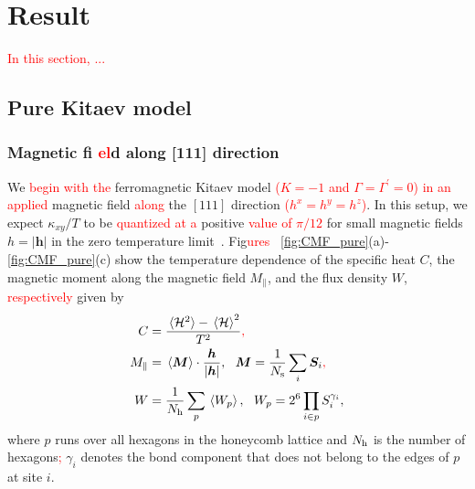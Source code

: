 \documentclass[twocolumn,superscriptaddress,showpacs, longbibliography, aps, prb]{revtex4-2}
\def\vec#1{\boldsymbol #1}
\newcommand{\red}[1]{\textcolor{red}{#1}}
\newcommand{\orange}[1]{\textcolor{orange}{#1}}
\begin{document}
\section{Result}\label{sec:Results}
\red{In this section, ...}

\subsection{Pure Kitaev model}
\label{sec:pureKitaev}
\subsubsection{Magnetic fi%
\red{el}d along [111] direction}
We %
\red{begin with the} ferromagnetic Kitaev model %
\red{($K=-1$ and $\Gamma = \Gamma^\prime = 0$)} 
\red{in an applied} magnetic field %
\red{along} the $[111]$ direction \red{($h^x=h^y=h^z$)}. 
In this setup, we expect %
$\kappa_{xy}/T$ to be \red{quantized at a} positive \red{value of $\pi/12$} 
for small magnetic fields $h = |\vec{h}|$ in 
the zero temperature limit~\cite{Kitaev2006}. 
%
Fig\red{ures}%
~\ref{fig:CMF_pure}(a)-\ref{fig:CMF_pure}(c) show the temperature dependence of 
the specific heat 
$C$, the magnetic moment along the magnetic field $M_{\parallel}$, and the flux density $W$, %
\red{respectively} given by
\begin{align}
C&=\frac{\ev*{{\cal H}^{2}}-\ev*{{\cal H}}^2}{T^2}\red{,} \label{eq:C}\\
M_{\parallel}&=\ev*{\vec{M}}%
\cdot\frac{\vec{h}}{|\vec{h}|},~~\vec{M}=\frac{1}{N_{\rm s}}\sum_{i}\vec{S}_{i}\red{,} \label{eq:Mag}\\
W&=\frac{1}{N_{\rm h}}\sum_{p}\ev*{W_{p}}, %
~~W_{p}=2^6\prod_{i\in p}S^{\gamma_{i}}_{i} \label{eq:W},
\end{align}
where $p$ runs over all hexagons in the honeycomb lattice and $N_{\rm h}$ is the number of hexagons\red{;} %
$\gamma_{i}$ %
denotes the bond component %
that does not belong to the edges of $p$ at site $i$.

\end{document}

